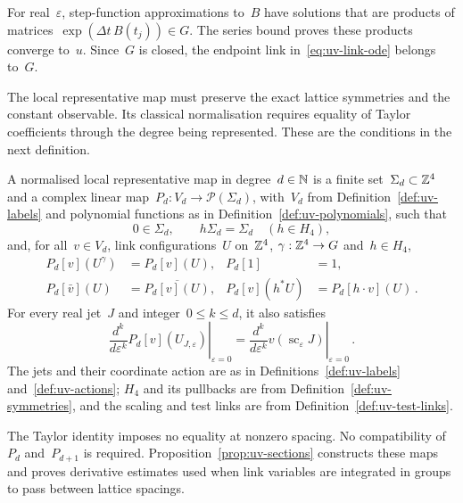 For real~$\varepsilon$, step-function approximations to~$B$ have solutions that are products of matrices~$\exp(\Delta t\,B(t_j))\in G$. The series bound proves these products converge to~$u$. Since~$G$ is closed, the endpoint link in~\eqref{eq:uv-link-ode} belongs to~$G$.

The local representative map must preserve the exact lattice symmetries and the constant observable.
Its classical normalisation requires equality of Taylor coefficients through the degree being represented.
These are the conditions in the next definition.

\begin{definition}\label{def:uv-sections}
A normalised local representative map in degree~$d\in\mathbb N$ is a finite set~$\Sigma_d\subset\mathbb Z^4$ and a complex linear map~$P_d:V_d\to\mathcal P(\Sigma_d)$, with~$V_d$ from Definition~\ref{def:uv-labels} and polynomial functions as in Definition~\ref{def:uv-polynomials}, such that
\begin{equation}\label{eq:uv-section-support}
 0\in\Sigma_d,\qquad h\Sigma_d=\Sigma_d\quad(h\in H_4),
\end{equation}
and, for all~$v\in V_d$, link configurations~$U$ on~$\mathbb Z^4$, $\gamma:\mathbb Z^4\to G$ and~$h\in H_4$,
\begin{equation}\label{eq:uv-section-symmetry}
 \begin{aligned}
 P_d[v](U^\gamma)&=P_d[v](U), & P_d[1]&=1,\\
 P_d[\bar v](U)&=\overline{P_d[v](U)}, &
 P_d[v](h^*U)&=P_d[h\cdot v](U)\,.
 \end{aligned}
\end{equation}
For every real jet~$J$ and integer~$0\le k\le d$, it also satisfies
\begin{equation}\label{eq:uv-section-taylor}
 \left.\frac{d^k}{d\varepsilon^k}P_d[v](U_{J,\varepsilon})\right|_{\varepsilon=0}
 =\left.\frac{d^k}{d\varepsilon^k}v(\operatorname{sc}_\varepsilon J)\right|_{\varepsilon=0}\,.
\end{equation}
The jets and their coordinate action are as in Definitions~\ref{def:uv-labels} and~\ref{def:uv-actions}; $H_4$ and its pullbacks are from Definition~\ref{def:uv-symmetries}, and the scaling and test links are from Definition~\ref{def:uv-test-links}.
\end{definition}

The Taylor identity imposes no equality at nonzero spacing.
No compatibility of~$P_d$ and~$P_{d+1}$ is required.
Proposition~\ref{prop:uv-sections} constructs these maps and proves derivative estimates used when link variables are integrated in groups to pass between lattice spacings.

